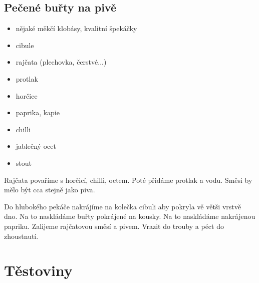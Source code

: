 \documentclass[10pt,a4paper]{article}
\newenvironment{myitemize}
{ \begin{itemize}
    \setlength{\itemsep}{0pt}
    \setlength{\parskip}{0pt}
    \setlength{\parsep}{0pt}     }
{ \end{itemize}                  }
\begin{document}
\subsection{Pečené buřty na pivě}
\begin{minipage}[t]{0,5\textwidth}
\begin{myitemize} 
\item nějaké měkčí klobásy, kvalitní špekáčky
\item cibule
\item rajčata (plechovka, čerstvé...)
\item protlak
\item horčice
\item paprika, kapie
\item chilli
\item jablečný ocet
\item stout
\end{myitemize}
\end{minipage}
\begin{minipage}[t]{0,5\textwidth}
Rajčata povaříme s horčicí, chilli, octem. Poté přidáme protlak a vodu. Směsi by mělo být cca stejně jako piva. 

Do hlubokého pekáče nakrájíme na kolečka cibuli aby pokryla vě větši vrstvě dno. Na to naskládáme buřty pokrájené na kousky. Na to naskládáme nakrájenou papriku. Zalijeme rajčatovou směsí a pivem. Vrazit do trouby a péct do zhoustnutí.
\end{minipage}

\pagebreak
\section{Těstoviny}
\end{document}
